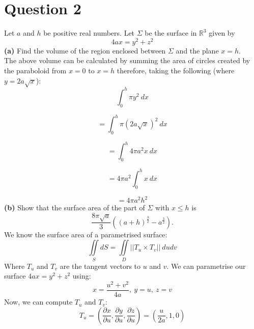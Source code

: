 \documentclass[12pt]{article}
\begin{document}
\section*{Question 2}
Let $a$ and $h$ be positive real numbers. Let $\Sigma$ be the surface in $\mathbb{R}^3$ given by
$$
	4ax=y^2+z^2
$$
\textbf{(a)} Find the volume of the region enclosed between $\Sigma$ and the plane $x=h$.\\
\medskip
The above volume can be calculated by summing the area of circles created by the paraboloid from $x=0$ to $x=h$ therefore, taking the following (where $y=2a\sqrt{x}$):
$$
	\int_{0}^{h}\pi y^2 \ dx
$$

$$
	=\int_{0}^{h}\pi (2a\sqrt{x})^2 \ dx
$$

$$
	=\int_{0}^{h}4\pi a^2x \ dx
$$

$$
	=4\pi a^2\int_{0}^{h}x \ dx
$$

$$
	=4\pi a^2h^2
$$
\textbf{(b)} Show that the surface area of the part of $\Sigma$ with $x\leq h$ is
$$
	\frac{8\pi\sqrt{a}}{3}\left( (a+h)^\frac{3}{2} -a^\frac{3}{2} \right)\text{.}
$$
\smallskip
We know the surface area of a parametrised surface:
$$
 \iint\limits_{S}dS=\iint\limits_{D}||T_u\times T_v|| \ du dv
$$
Where $T_u$ and $T_v$ are the tangent vectors to $u$ and $v$.
\smallskip
We can parametrise our surface $4ax=y^2+z^2$ using:
$$
	x=\frac{u^2+v^2}{4a}, \ y=u, \ z=v
$$
Now, we can compute $T_u$ and $T_v$:
$$
T_u=\left( \frac{\partial x}{\partial u},  \frac{\partial y}{\partial u},  \frac{\partial z}{\partial u} \right)
=\left( \frac{u}{2a},  1,  0 \right)
$$
\end{document}
